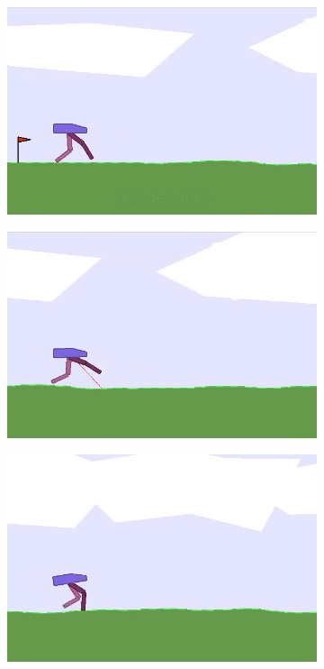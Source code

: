 \documentclass{article}
\begin{document}
\begin{figure}[!p]
\centering
  \begin{subfigure}{0.18\textwidth}
  \centering
  \includegraphics[width=\textwidth]{figures/bipedal/f1}
  \caption{}
  \end{subfigure}
  \begin{subfigure}{0.18\textwidth}
  \centering
  \includegraphics[width=\textwidth]{figures/bipedal/f2}
  \caption{}
  \end{subfigure}
  \begin{subfigure}{0.18\textwidth}
  \centering
  \includegraphics[width=\textwidth]{figures/bipedal/f3}

\end{subfigure}
\end{figure}
\end{document}
